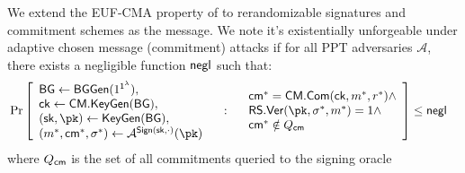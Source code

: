 \begin{definition}\label{def:eufcma-commitment}
We extend the EUF-CMA property of \cite{DBLP:journals/siamcomp/GoldwasserMR88} to rerandomizable signatures and commitment schemes as the message. We note it's existentially unforgeable under adaptive chosen message (commitment) attacks if for all PPT adversaries $\mathcal{A}$, there exists a negligible function $\mathsf{negl}$ such that:
    \begin{align*}
        &\Pr\left[
            \begin{array}{l}
                \mathsf{BG} \gets \mathsf{BGGen}(1^{\secparam}), \\
                \mathsf{ck} \gets \mathsf{CM.KeyGen}(\mathsf{BG}), \\
                (\sk, \pk) \gets \mathsf{KeyGen}(\mathsf{BG}), \\
                (m^*, \cm^*, \sigma^*) \gets \mathcal{A}^{\mathsf{Sign}(\sk, \cdot)}(\pk) \\
                \end{array}
                \quad : \quad
                \begin{array}{l}
                \cm^* = \mathsf{CM.Com}(\mathsf{ck}, m^*, r^*) \land \\
                \mathsf{RS.Ver}(\pk, \sigma^*, m^*) = 1 \land \\
                \cm^* \notin Q_{\cm}
            \end{array}
        \right] \leq \negl
    \end{align*}
where $Q_{\mathsf{cm}}$ is the set of all commitments queried to the signing oracle
\end{definition}


